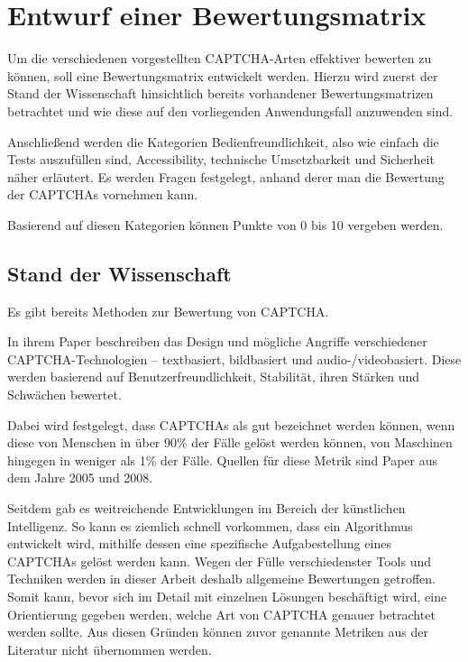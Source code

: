 \chapter{Entwurf einer Bewertungsmatrix}
\label{ch:matrix}

Um die verschiedenen vorgestellten CAPTCHA-Arten effektiver bewerten zu können, soll eine Bewertungsmatrix entwickelt werden.
Hierzu wird zuerst der Stand der Wissenschaft hinsichtlich bereits vorhandener Bewertungsmatrizen betrachtet
und wie diese auf den vorliegenden Anwendungsfall anzuwenden sind.

Anschließend werden die Kategorien Bedienfreundlichkeit, also wie einfach die Tests auszufüllen sind, Accessibility, technische Umsetzbarkeit
und Sicherheit näher erläutert.
Es werden Fragen festgelegt, anhand derer man die Bewertung der CAPTCHAs vornehmen kann.

Basierend auf diesen Kategorien können Punkte von 0 bis 10 vergeben werden.

\section{Stand der Wissenschaft}
\label{ch:matrix:sdw}

Es gibt bereits Methoden zur Bewertung von CAPTCHA.

In ihrem Paper  beschreiben \citeauthor{surveyofresearch} das Design
und mögliche Angriffe verschiedener CAPTCHA-Technologien – textbasiert, bildbasiert und audio-/videobasiert.
Diese werden basierend auf Benutzerfreundlichkeit, Stabilität, ihren Stärken und Schwächen bewertet.  

Dabei wird festgelegt, dass CAPTCHAs als gut bezeichnet werden können, wenn diese von Menschen in über 90\% der Fälle gelöst werden können,
von Maschinen hingegen in weniger als 1\% der Fälle.
Quellen für diese Metrik sind Paper aus dem Jahre 2005 und 2008. \cite[p.75]{surveyofresearch}

Seitdem gab es weitreichende Entwicklungen im Bereich der künstlichen Intelligenz.
So kann es ziemlich schnell vorkommen, dass ein Algorithmus entwickelt wird, mithilfe dessen eine spezifische Aufgabestellung eines CAPTCHAs gelöst werden kann.
Wegen der Fülle verschiedenster Tools und Techniken werden in dieser Arbeit deshalb allgemeine Bewertungen getroffen.
Somit kann, bevor sich im Detail mit einzelnen Lösungen beschäftigt wird, eine Orientierung gegeben werden, welche Art von CAPTCHA genauer betrachtet werden sollte.
Aus diesen Gründen können zuvor genannte Metriken aus der Literatur nicht übernommen werden.

